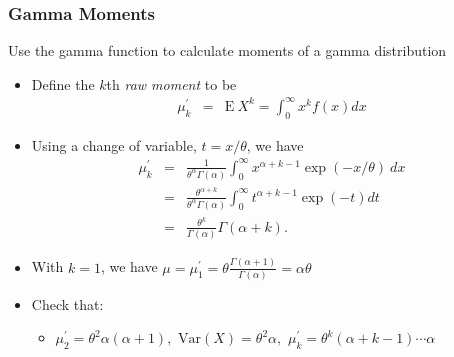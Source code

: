 \documentclass{beamer}
\begin{document}
\begin{frame}[shrink=2]
\frametitle{Gamma Moments} Use the gamma function to calculate
moments of a gamma distribution \vspace{2mm}
\begin{itemize}
\item Define the $k$th \textit{raw moment} to be
\begin{eqnarray*}
\mu_k^{\prime} &=& \mathrm{E~} X^k = \int_0^{\infty} x^k f(x) dx
\end{eqnarray*} \vspace{2mm}

\item Using a change of variable, $t=x/\theta$, we have
\begin{eqnarray*}
\mu_k^{\prime}
&=& \frac{1}{\theta^{\alpha} \Gamma(\alpha)} \int_0^{\infty} x^{\alpha+k-1} \exp(-x/\theta) ~dx \\
&=& \frac{\theta^{\alpha+k}}{\theta^{\alpha} \Gamma(\alpha)} \int_0^{\infty} t^{\alpha+k-1} \exp(-t) dt \\
&=& \frac{\theta^k }{\Gamma(\alpha)} \Gamma(\alpha+k).
\end{eqnarray*} \vspace{2mm}
\item With $k=1$, we have $\mu = \mu_1^{\prime}
= \theta \frac{\Gamma(\alpha+1)}{\Gamma(\alpha)} = \alpha \theta$
\vspace{2mm}
\item Check that:
\begin{itemize}
\item $ \mu_2^{\prime} = \theta^2 \alpha (\alpha+1), $ \hspace{0.2in} $ \mathrm{Var}(X)  =\theta^2
\alpha,
$ \hspace{0.2in} $\mu_k^{\prime} = \theta^k(\alpha+k-1) \cdots
\alpha$
\end{itemize}\end{itemize}
\end{frame}
\end{document}
